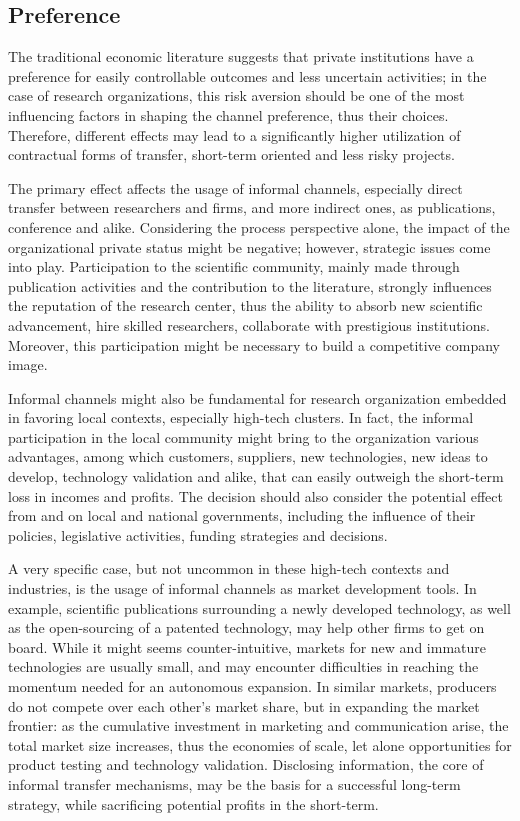 \subsection{Preference}

The traditional economic literature suggests that private institutions have a preference for easily controllable outcomes and less uncertain activities; in the case of research organizations, this risk aversion should be one of the most influencing factors in shaping the channel preference, thus their choices. Therefore, different effects may lead to a significantly higher utilization of contractual forms of transfer, short-term oriented and less risky projects.

The primary effect affects the usage of informal channels, especially direct transfer between researchers and firms, and more indirect ones, as publications, conference and alike. Considering the process perspective alone, the impact of the organizational private status might be negative; however, strategic issues come into play. Participation to the scientific community, mainly made through publication activities and the contribution to the literature, strongly influences the reputation of the research center, thus the ability to absorb new scientific advancement, hire skilled researchers, collaborate with prestigious institutions. Moreover, this participation might be necessary to build a competitive company image.

Informal channels might also be fundamental for research organization embedded in favoring local contexts, especially high-tech clusters. In fact, the informal participation in the local community might bring to the organization various advantages, among which customers, suppliers, new technologies, new ideas to develop, technology validation and alike, that can easily outweigh the short-term loss in incomes and profits. The decision should also consider the potential effect from and on local and national governments, including the influence of their policies, legislative activities, funding strategies and decisions. 

A very specific case, but not uncommon in these high-tech contexts and industries, is the usage of informal channels as market development tools. In example, scientific publications surrounding a newly developed technology, as well as the open-sourcing of a patented technology, may help other firms to get on board. While it might seems counter-intuitive, markets for new and immature technologies are usually small, and may encounter difficulties in reaching the momentum needed for an autonomous expansion. In similar markets, producers do not compete over each other's market share, but in expanding the market frontier: as the cumulative investment in marketing and communication arise, the total market size increases, thus the economies of scale, let alone opportunities for product testing and technology validation. Disclosing information, the core of informal transfer mechanisms, may be the basis for a successful long-term strategy, while sacrificing potential profits in the short-term.

